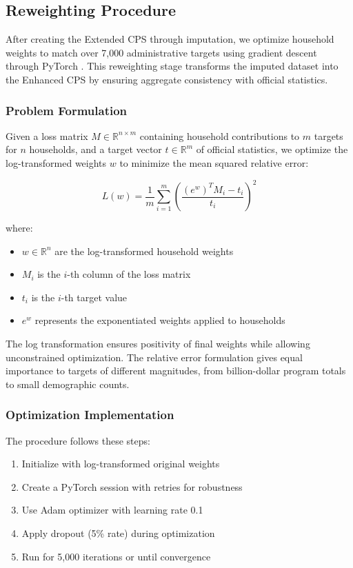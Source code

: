 \subsection{Reweighting Procedure}

After creating the Extended CPS through imputation, we optimize household weights to match over 7,000 administrative targets using gradient descent through PyTorch \citep{pytorch2019}. This reweighting stage transforms the imputed dataset into the Enhanced CPS by ensuring aggregate consistency with official statistics.

\subsubsection{Problem Formulation}

Given a loss matrix $M \in \mathbb{R}^{n \times m}$ containing household contributions to $m$ targets for $n$ households, and a target vector $t \in \mathbb{R}^m$ of official statistics, we optimize the log-transformed weights $w$ to minimize the mean squared relative error:

\[ L(w) = \frac{1}{m} \sum_{i=1}^{m} \left(\frac{(e^w)^T M_i - t_i}{t_i}\right)^2 \]

where:
\begin{itemize}
    \item $w \in \mathbb{R}^n$ are the log-transformed household weights
    \item $M_i$ is the $i$-th column of the loss matrix
    \item $t_i$ is the $i$-th target value
    \item $e^w$ represents the exponentiated weights applied to households
\end{itemize}

The log transformation ensures positivity of final weights while allowing unconstrained optimization. The relative error formulation gives equal importance to targets of different magnitudes, from billion-dollar program totals to small demographic counts.

\subsubsection{Optimization Implementation}

The procedure follows these steps:

\begin{enumerate}
    \item Initialize with log-transformed original weights
    \item Create a PyTorch session with retries for robustness
    \item Use Adam optimizer with learning rate 0.1
    \item Apply dropout (5\% rate) during optimization
    \item Run for 5,000 iterations or until convergence
\end{enumerate}

